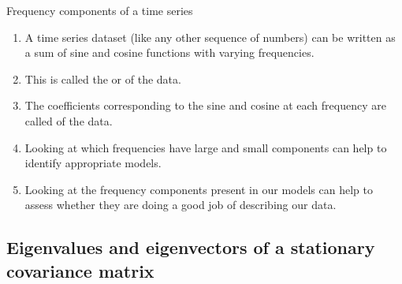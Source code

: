 \begin{frame}{Frequency components of a time series}

\begin{enumerate}
\item A time series dataset (like any other sequence of numbers) can be written as a sum of sine and cosine functions with varying frequencies.
\item This is called the  or  of the data.
\item The coefficients corresponding to the sine and cosine at each frequency are called  of the data.
\item   Looking at which frequencies have large and small components can help to identify appropriate models.
\item Looking at the frequency components present in our models can help to assess whether they are doing a good job of describing our data.

\end{enumerate}

\end{frame}

\subsection{Eigenvalues and eigenvectors of a stationary covariance matrix}

